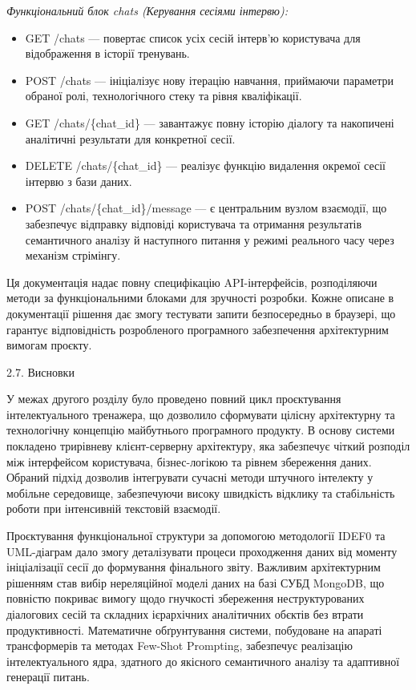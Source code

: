 \emph{Функціональний блок chats (Керування сесіями
інтерв\textquotesingle ю):}

\begin{itemize}
\item
  GET /chats --- повертає список усіх сесій інтерв'ю користувача для
  відображення в історії тренувань.
\item
  POST /chats --- ініціалізує нову ітерацію навчання, приймаючи
  параметри обраної ролі, технологічного стеку та рівня кваліфікації.
\item
  GET /chats/\{chat\_id\} --- завантажує повну історію діалогу та
  накопичені аналітичні результати для конкретної сесії.
\item
  DELETE /chats/\{chat\_id\} --- реалізує функцію видалення окремої
  сесії інтерв\textquotesingle ю з бази даних.
\item
  POST /chats/\{chat\_id\}/message --- є центральним вузлом взаємодії,
  що забезпечує відправку відповіді користувача та отримання результатів
  семантичного аналізу й наступного питання у режимі реального часу
  через механізм стрімінгу.
\end{itemize}

Ця документація надає повну специфікацію API-інтерфейсів, розподіляючи
методи за функціональними блоками для зручності розробки. Кожне описане
в документації рішення дає змогу тестувати запити безпосередньо в
браузері, що гарантує відповідність розробленого програмного
забезпечення архітектурним вимогам проєкту.

\protect{}\label{_Toc228981065}{}2.7. Висновки

У межах другого розділу було проведено повний цикл проєктування
інтелектуального тренажера, що дозволило сформувати цілісну архітектурну
та технологічну концепцію майбутнього програмного продукту. В основу
системи покладено трирівневу клієнт-серверну архітектуру, яка забезпечує
чіткий розподіл між інтерфейсом користувача, бізнес-логікою та рівнем
збереження даних. Обраний підхід дозволив інтегрувати сучасні методи
штучного інтелекту у мобільне середовище, забезпечуючи високу швидкість
відклику та стабільність роботи при інтенсивній текстовій взаємодії.

Проєктування функціональної структури за допомогою методології IDEF0 та
UML-діаграм дало змогу деталізувати процеси проходження даних від
моменту ініціалізації сесії до формування фінального звіту. Важливим
архітектурним рішенням став вибір нереляційної моделі даних на базі СУБД
MongoDB, що повністю покриває вимогу щодо гнучкості збереження
неструктурованих діалогових сесій та складних ієрархічних аналітичних
об\textquotesingle єктів без втрати продуктивності. Математичне
обґрунтування системи, побудоване на апараті трансформерів та методах
Few-Shot Prompting, забезпечує реалізацію інтелектуального ядра,
здатного до якісного семантичного аналізу та адаптивної генерації
питань.

